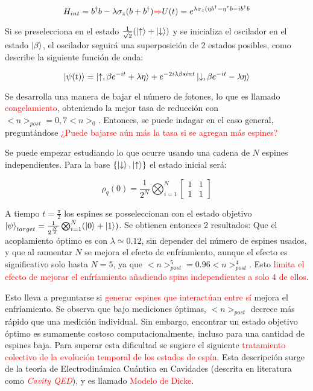 \documentclass{book}
\begin{document}
\begin{equation}\label{eq10.8}H_{int}=b^\dag  b-\lambda\sigma_z(b+b^\dag) \textcolor{red}{\Rightarrow} U(t)=e^{\lambda\sigma_z(\eta b^\dag-\eta^* b-ib^\dag b}\end{equation}

Si se preselecciona en el estado  $\frac{1}{\sqrt{2}}(\ket{\uparrow}+\ket{\downarrow})$ y se inicializa el oscilador en el estado $\ket{\beta}$, el oscilador seguirá una superposición de 2 estados posibles, como describe la siguiente función de onda:

\begin{equation}\label{eq10.9}\ket{\psi(t)}=\ket{\uparrow,\beta e^{-it}+\lambda\eta}+e^{-2i\lambda\beta sin t}\ket{\downarrow,\beta e^{-it}-\lambda\eta}\end{equation}

Se desarrolla una manera de bajar el número de fotones, lo que es llamado \textcolor{red}{congelamiento}, obteniendo la mejor tasa de reducción con $<n>_{post}=0,7<n>_0$. Entonces, se puede indagar en el caso general, preguntándose \textcolor{red}{¿Puede bajarse aún más la tasa si se agregan más espines?}

Se puede empezar estudiando lo que ocurre usando una cadena de $N$ espines independientes. Para la base $\{\ket{\downarrow},\ket{\uparrow}\}$ el estado inicial será:

\begin{equation}\label{eq10.10}\rho_q(0)=\frac{1}{2^N}\bigotimes_{i=1}^N\begin{bmatrix} 1&1\\1&1 \end{bmatrix} \end{equation}

A tiempo $t=\frac{\pi}{2}$ los espines se posseleccionan con el estado objetivo $\ket{\psi}_{target}=\frac{1}{2^\frac{N}{2}}\bigotimes_{i=1}^N (\ket{0}+\ket{1})$. Se obtienen entonces 2 resultados: Que el acoplamiento óptimo es con $\lambda\simeq 0.12$, sin depender del número de espines usados, y que al aumentar $N$ se mejora el efecto de enfríamiento, aunque el efecto es significativo solo hasta $N=5$, ya que $<n>^5_{post}=0.96 <n>^4_{post}$. Esto \textcolor{red}{limita el efecto de mejorar el enfríamiento añadiendo spins independientes a solo 4 de ellos}. 

Esto lleva a preguntarse si \textcolor{red}{generar espines que interactúan entre sí} mejora el enfríamiento. Se observa que bajo mediciones óptimas, $<n>_{post}$ decrece más rápido que una medición individual. Sin embargo, encontrar un estado objetivo óptimo es sumamente costoso computacionalmente, incluso para una cantidad de espines baja. Para superar esta dificultad se sugiere el siguiente \textcolor{red}{tratamiento colectivo de la evolución temporal de los estados de espín}. Esta descripción surge de la teoría de Electrodinámica Cuántica en Cavidades (descrita en literatura como \textcolor{red}{\textit{Cavity QED}}), y es llamado \textcolor{red}{Modelo de Dicke}.
\end{document}
